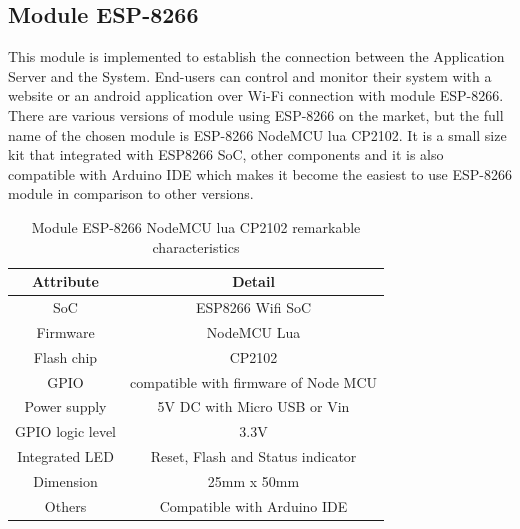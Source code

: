       \subsection{Module ESP-8266}
      This module is implemented to establish the connection between the Application Server and the System. End-users can control and monitor their system with a website or an android application over Wi-Fi connection with module ESP-8266. There are various versions of module using ESP-8266 on the market, but the full name of the chosen module is ESP-8266 NodeMCU lua CP2102. It is a small size kit that integrated with ESP8266 SoC, other components and it is also compatible with Arduino IDE which makes it become the easiest to use ESP-8266 module in comparison to other versions.
      \begin{table}[h!]
        \begin{center}
        \begin{tabular}{ |c|c|  }
          \hline
          Attribute & Detail\\
          \hline
          SoC& ESP8266 Wifi SoC\\
          \hline
          Firmware&   NodeMCU Lua\\
          \hline
          Flash chip &CP2102\\
          \hline
          GPIO & compatible with firmware of Node MCU\\
          \hline
          Power supply & 5V DC with Micro USB or Vin\\
          \hline
          GPIO logic level & 3.3V\\
          \hline
          Integrated LED & Reset, Flash and Status indicator\\
          \hline
          Dimension & 25mm x 50mm\\
          \hline
          Others& Compatible with Arduino IDE\\
          \hline
         \end{tabular}
         \caption{Module ESP-8266 NodeMCU lua CP2102 remarkable characteristics}
         \label{table:moduleEspDetail}
        \end{center}
        \end{table}

